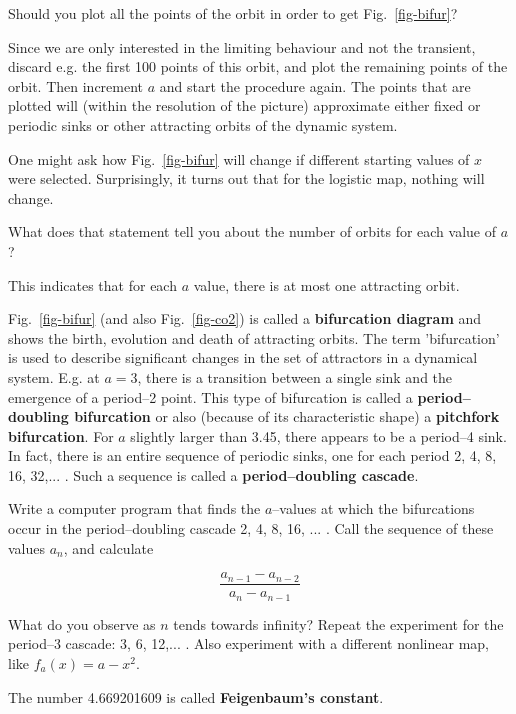 \begin{cue}
Should you plot all the points of the orbit in order to get Fig.~\ref{fig-bifur}?  
\end{cue}

Since we are only interested in the limiting behaviour and not the transient, discard e.g. the first 100 points of this orbit, and plot the remaining points of the orbit. Then increment $a$ and start the procedure again. The points that are plotted will (within the resolution of the picture) approximate either fixed or periodic sinks or other attracting orbits of the dynamic system.

One might ask how Fig.~\ref{fig-bifur} will change if different starting values of $x$ were selected. Surprisingly, it turns out that for the logistic map, nothing will change.

\begin{cue}
What does that statement tell you about the number of orbits for each value of $a$?  
\end{cue}

This indicates that for each $a$ value, there is at most one attracting orbit.

Fig.~\ref{fig-bifur} (and also Fig.~\ref{fig-co2}) is called a \textbf{bifurcation diagram} and shows the birth, evolution and death of attracting orbits. The term 'bifurcation' is used to describe significant changes in the set of attractors in a dynamical system. E.g. at $a=3$, there is a transition between a single sink and the emergence of a period--2 point. This type of bifurcation is called a \textbf{period--doubling bifurcation} or also (because of its characteristic shape) a \textbf{pitchfork bifurcation}. For $a$ slightly larger than 3.45, there appears to be a period--4 sink. In fact, there is an entire sequence of periodic sinks, one for each period 2, 4, 8, 16, 32,... . Such a sequence is called a \textbf{period--doubling cascade}.


\begin{exer}
Write a computer program that finds the $a$--values at which the bifurcations occur in the period--doubling cascade 2, 4, 8, 16, ... . Call the sequence of these values $a_n$, and calculate

$$\frac{a_{n-1} - a_{n-2}}{a_{n} - a_{n-1}}$$

What do you observe as $n$ tends towards infinity? Repeat the experiment for the period--3 cascade: 3, 6, 12,... . Also experiment with a different nonlinear map, like $f_a(x)=a-x^2$.

The number 4.669201609 is called \textbf{Feigenbaum's constant}.
\end{exer}


